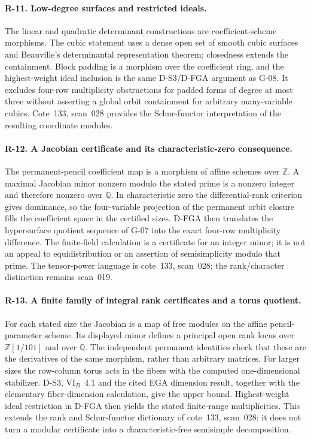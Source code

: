 \documentclass[11pt,a4paper]{article}
\theoremstyle{definition}\newtheorem{definition}{Definition}
\begin{document}
\paragraph{R-11. Low-degree surfaces and restricted ideals.}
The linear and quadratic determinant constructions are coefficient-scheme morphisms. The cubic statement uses a dense open set of smooth cubic surfaces and Beauville's determinantal representation theorem; closedness extends the containment. Block padding is a morphism over the coefficient ring, and the highest-weight ideal inclusion is the same D-S3/D-FGA argument as G-08. It excludes four-row multiplicity obstructions for padded forms of degree at most three without asserting a global orbit containment for arbitrary many-variable cubics. Cote~133, scan~028 provides the Schur-functor interpretation of the resulting coordinate modules.

\paragraph{R-12. A Jacobian certificate and its characteristic-zero consequence.}
The permanent-pencil coefficient map is a morphism of affine schemes over $\mathbb Z$. A maximal Jacobian minor nonzero modulo the stated prime is a nonzero integer and therefore nonzero over $\mathbb Q$. In characteristic zero the differential-rank criterion gives dominance, so the four-variable projection of the permanent orbit closure fills the coefficient space in the certified sizes. D-FGA then translates the hypersurface quotient sequence of G-07 into the exact four-row multiplicity difference. The finite-field calculation is a certificate for an integer minor; it is not an appeal to equidistribution or an assertion of semisimplicity modulo that prime. The tensor-power language is cote~133, scan~028; the rank/character distinction remains scan~019.


\paragraph{R-13. A finite family of integral rank certificates and a torus quotient.}
For each stated size the Jacobian is a map of free modules on the affine pencil-parameter scheme. Its displayed minor defines a principal open rank locus over $\mathbb Z[1/101]$ and over $\mathbb Q$. The independent permanent identities check that these are the derivatives of the same morphism, rather than arbitrary matrices. For larger sizes the row-column torus acts in the fibers with the computed one-dimensional stabilizer. D-S3, VI$_B$~4.1 and the cited EGA dimension result, together with the elementary fiber-dimension calculation, give the upper bound. Highest-weight ideal restriction in D-FGA then yields the stated finite-range multiplicities. This extends the rank and Schur-functor dictionary of cote~133, scan~028; it does not turn a modular certificate into a characteristic-free semisimple decomposition.
\end{document}
